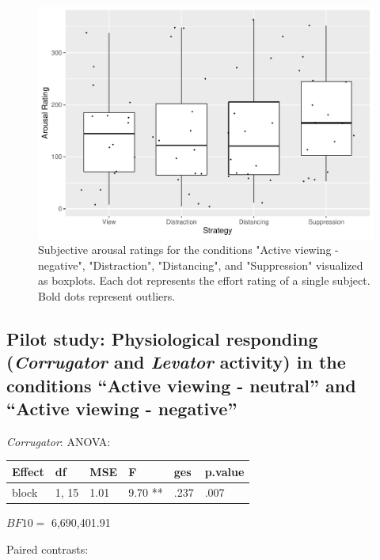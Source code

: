 \documentclass[
  english,
  man,floatsintext]{apa6}
\begin{document}
\begin{figure}[H]
\includegraphics[width=0.75\linewidth]{Manuscript_ERED_Stage1_files/figure-latex/FigSubjArousalRegPilot-1} \caption{Subjective arousal ratings for the conditions "Active viewing - negative", "Distraction", "Distancing", and "Suppression" visualized as boxplots. Each dot represents the effort rating of a single subject. Bold dots represent outliers.}\label{fig:FigSubjArousalRegPilot}
\end{figure}

\hypertarget{pilot-study-physiological-responding-corrugator-and-levator-activity-in-the-conditions-active-viewing---neutral-and-active-viewing---negative}{%
\subsection{\texorpdfstring{Pilot study: Physiological responding (\emph{Corrugator} and \emph{Levator} activity) in the conditions ``Active viewing - neutral'' and ``Active viewing - negative''}{Pilot study: Physiological responding (Corrugator and Levator activity) in the conditions ``Active viewing - neutral'' and ``Active viewing - negative''}}\label{pilot-study-physiological-responding-corrugator-and-levator-activity-in-the-conditions-active-viewing---neutral-and-active-viewing---negative}}

\emph{Corrugator}:
ANOVA:

\begin{tabular}{l|l|l|l|l|l}
\hline
Effect & df & MSE & F & ges & p.value\\
\hline
block & 1, 15 & 1.01 & 9.70 ** & .237 & .007\\
\hline
\end{tabular}

\(BF10=\) 6,690,401.91

Paired contrasts:
\end{document}
